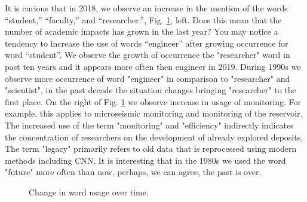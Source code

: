 \documentclass[geosciences,article,submit,moreauthors,pdftex]{Definitions/mdpi}
\begin{document}
It is curious that in 2018, we observe an increase in the mention of the words “student,” “faculty,” and “researcher.”, Fig. \ref{stu_faculty_mon}, left.  Does this mean that the number of academic impacts has grown in the last year? You may notice a tendency to increase the use of words “engineer” after growing occurrence for word “student”. We observe the growth of occurrence the "researcher" word in past ten years and it appears more often then engineer in 2019. During 1990s we observe more occurrence of word "engineer" in comparison to "researcher" and "scientist", in the past decade the situation changes bringing "researcher" to the first place. On the right of Fig. \ref{stu_faculty_mon} we observe increase in usage of monitoring. For example, this applies to microseismic monitoring and monitoring of the reservoir. The increased use of the term "monitoring" and "efficiency" indirectly indicates the concentration of researchers on the development of already explored deposits. The term "legacy" primarily refers to old data that is reprocessed using modern methods including CNN. It is interesting that in the 1980s we used the word "future" more often than now, perhaps, we can agree, the past is over.


\begin{figure}[ht!]

\begin{minipage}{0.49\linewidth}
\end{minipage}
\hfill
\begin{minipage}{0.49\linewidth}
\end{minipage}
\caption{Change in word usage over time.}
\label{stu_faculty_mon}
\end{figure}
\end{document}
